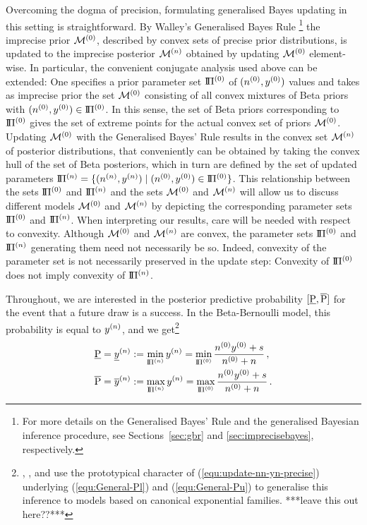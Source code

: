 Overcoming the dogma of precision, formulating generalised Bayes
updating in this setting is straightforward. By Walley's Generalised
Bayes Rule \parencite[\S 6]{1991:walley}%
\footnote{For more details on the Generalised Bayes' Rule and the generalised Bayesian inference procedure,
see Sections~\ref{sec:gbr} and \ref{sec:imprecisebayes}, respectively.}
the imprecise prior $\mathcal{M}^{(0)}$, described by convex sets of precise prior distributions,
is updated to the imprecise posterior $\mathcal{M}^{(n)}$ obtained by updating $\mathcal{M}^{(0)}$ element-wise.
In particular, the convenient conjugate analysis used above can be extended:
One specifies a prior parameter set
$\text{I}\!\Pi^{(0)}$ of $(n^{(0)},y^{(0)})$ values and takes as imprecise
prior the set $\mathcal{M}^{(0)}$ consisting of  all convex mixtures of Beta
priors with $(n^{(0)}, y^{(0)}) \in \text{I}\!\Pi^{(0)}$. In this sense, the set of Beta
priors corresponding to $\text{I}\!\Pi^{(0)}$ gives the set of extreme points for
the actual convex set of priors $\mathcal{M}^{(0)}$. Updating $\mathcal{M}^{(0)}$ with the
Generalised Bayes' Rule results in the convex set $\mathcal{M}^{(n)}$ of posterior
distributions, that conveniently can be obtained by taking the
convex hull of the set of Beta posteriors, which in turn are defined
by the set of updated parameters
$\text{I}\!\Pi^{(n)} = \{(n^{(n)},y^{(n)}) \mid (n^{(0)}, y^{(0)}) \in \text{I}\!\Pi^{(0)}\}$.
This relationship between the sets $\text{I}\!\Pi^{(0)}$ and $\text{I}\!\Pi^{(n)}$ and the sets $\mathcal{M}^{(0)}$
and $\mathcal{M}^{(n)}$ will allow us to discuss different models $\mathcal{M}^{(0)}$ and $\mathcal{M}^{(n)}$ by depicting
the corresponding parameter sets $\text{I}\!\Pi^{(0)}$ and $\text{I}\!\Pi^{(n)}$. When interpreting our results,
care will be needed with respect to convexity. Although
$\mathcal{M}^{(0)}$ and $\mathcal{M}^{(n)}$ are convex, the parameter sets $\text{I}\!\Pi^{(0)}$ and $\text{I}\!\Pi^{(n)}$
generating them need not necessarily be so. %
Indeed, convexity of the parameter set is not necessarily preserved in the update
step: Convexity of $\text{I}\!\Pi^{(0)}$ does not imply convexity of $\text{I}\!\Pi^{(n)}$.

Throughout, we are interested in the posterior predictive
probability $[\underline{\operatorname{P}},\overline{\operatorname{P}}]$ for the event that a
future draw is a success. In the Beta-Bernoulli model, this
probability is equal to $y^{(n)}$, and we get\footnote{%
\textcite{2005:quaeghebeurcooman}, \textcite{Walter2009a}, and \textcite{Walter2007a} use the prototypical character of
(\ref{equ:update-nn-yn-precise}) underlying (\ref{equ:General-Pl}) and
(\ref{equ:General-Pu}) to generalise this inference to models based on
canonical exponential families. ***leave this out here??***}
%
\begin{align}
\underline{\operatorname{P}} = \underline{y}^{(n)} &:= \min_{\text{I}\!\Pi^{(n)}} y^{(n)} = \min_{\text{I}\!\Pi^{(0)}} \frac{n^{(0)}y^{(0)} + s}{n^{(0)} +n}\,, \label{equ:General-Pl}\\
\overline{\operatorname{P}} = \overline{y}^{(n)} &:= \max_{\text{I}\!\Pi^{(n)}} y^{(n)} = \max_{\text{I}\!\Pi^{(0)}} \frac{n^{(0)}y^{(0)} + s}{n^{(0)} +n}\,. \label{equ:General-Pu}
\end{align}


